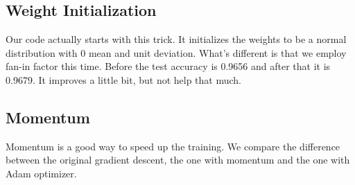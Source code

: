 \documentclass{article}
\begin{document}
\subsection{Weight Initialization}
Our code actually starts with this trick. It initializes the weights to be a normal distribution with 0 mean and unit deviation. What's different is that we employ fan-in factor this time. Before the test accuracy is 0.9656 and after that it is 0.9679. It improves a little bit, but not help that much.
\subsection{Momentum}
Momentum is a good way to speed up the training. We compare the difference between the original gradient descent, the one with momentum and the one with Adam optimizer.
\end{document}
